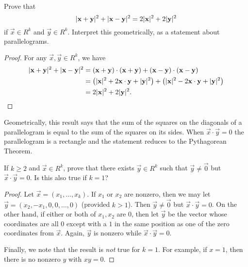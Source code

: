 
 Prove that
\begin{equation*}
  \lvert{\mathbf{x} + \mathbf{y}}\rvert^2 + \lvert{\mathbf{x} - \mathbf{y}}\rvert^2
  = 2\lvert{\mathbf{x}}\rvert^2 + 2\lvert{\mathbf{y}}\rvert^2
\end{equation*}
if $\vec{x}\in R^k$ and $\vec{y}\in R^k$. Interpret this
geometrically, as a statement about parallelograms.
\begin{proof}
  For any $\vec{x},\vec{y}\in R^k$, we have
  \begin{align*}
    \lvert{\mathbf{x} + \mathbf{y}}\rvert^2 + \lvert{\mathbf{x} - \mathbf{y}}\rvert^2
    &= (\mathbf{x} + \mathbf{y})\cdot(\mathbf{x} + \mathbf{y})
      + (\mathbf{x} - \mathbf{y})\cdot(\mathbf{x} - \mathbf{y}) \\
    &= \left(\lvert{\mathbf{x}}\rvert^2 + 2\mathbf{x}\cdot\mathbf{y} + \lvert{\mathbf{y}}\rvert^2\right)
      + \left(\lvert{\mathbf{x}}\rvert^2 - 2\mathbf{x}\cdot\mathbf{y} + \lvert{\mathbf{y}}\rvert^2\right) \\
    &= 2\lvert{\mathbf{x}}\rvert^2 + 2\lvert{\mathbf{y}}\rvert^2. \qedhere
  \end{align*}
\end{proof}

Geometrically, this result says that the sum of the squares on the
diagonals of a parallelogram is equal to the sum of the squares on its
sides. When $\vec{x}\cdot\vec{y} = 0$ the parallelogram is a rectangle
and the statement reduces to the Pythagorean Theorem.

 If $k\geq2$ and $\vec{x}\in R^k$, prove that there
exists $\vec{y}\in R^k$ such that $\vec{y}\neq\vec{0}$ but
$\vec{x}\cdot\vec{y} = 0$. Is this also true if $k = 1$?
\begin{proof}
  Let $\vec{x} = (x_1, \dots, x_k)$. If $x_1$ or $x_2$ are nonzero,
  then we may let $\vec{y} = (x_2, -x_1, 0, 0, \dots, 0)$ (provided
  $k > 1$). Then $\vec{y}\neq\vec{0}$ but $\vec{x}\cdot\vec{y} =
  0$. On the other hand, if either or both of $x_1,x_2$ are $0$, then
  let $\vec{y}$ be the vector whose coordinates are all $0$ except
  with a $1$ in the same position as one of the zero coordinates from
  $\vec{x}$. Again, $\vec{y}$ is nonzero while
  $\vec{x}\cdot\vec{y} = 0$.

  Finally, we note that the result is {\em not} true for $k = 1$. For
  example, if $x = 1$, then there is no nonzero $y$ with $xy = 0$.
\end{proof}
